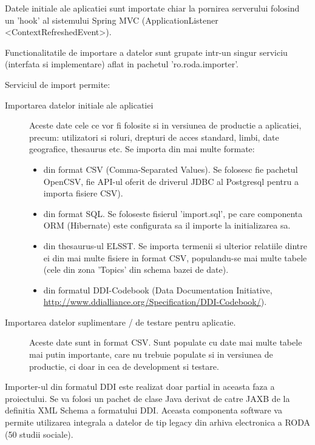 Datele initiale ale aplicatiei sunt importate chiar la pornirea serverului folosind un 'hook' al sistemului Spring MVC (ApplicationListener <ContextRefreshedEvent>).

Functionalitatile de importare a datelor sunt grupate intr-un singur serviciu (interfata si implementare) aflat in pachetul 'ro.roda.importer'.

Serviciul de import permite:
\begin{description}
\item
[Importarea datelor initiale ale aplicatiei] 

Aceste date cele ce vor fi folosite si in versiunea de productie a aplicatiei, precum: utilizatori si roluri, drepturi de acces standard, limbi, date geografice, thesaurus etc.
Se importa din mai multe formate:
\begin{itemize}
\item din format CSV (Comma-Separated Values). Se folosesc fie pachetul OpenCSV, fie API-ul oferit de driverul JDBC al Postgresql pentru a importa fisiere CSV).
\item din format SQL. Se foloseste fisierul 'import.sql', pe care componenta ORM (Hibernate) este configurata sa il importe la initializarea sa.
\item din thesaurus-ul ELSST. Se importa termenii si ulterior relatiile dintre ei din mai multe fisiere in format CSV, 
populandu-se mai multe tabele (cele din zona 'Topics' din schema bazei de date).
\item din formatul DDI-Codebook (Data Documentation Initiative, \url{http://www.ddialliance.org/Specification/DDI-Codebook/}).
\end{itemize}

\item
[Importarea datelor suplimentare / de testare pentru aplicatie.]

Aceste date sunt in format CSV. 
Sunt populate cu date mai multe tabele mai putin importante, care nu trebuie populate si in versiunea de productie, ci doar in cea de development si testare. 
\end{description}

Importer-ul din formatul DDI este realizat doar partial in aceasta faza a proiectului.
Se va folosi un pachet de clase Java derivat de catre JAXB de la definitia XML Schema a formatului DDI.
Aceasta componenta software va permite utilizarea integrala a datelor de tip legacy din arhiva electronica a RODA (50 studii sociale).
